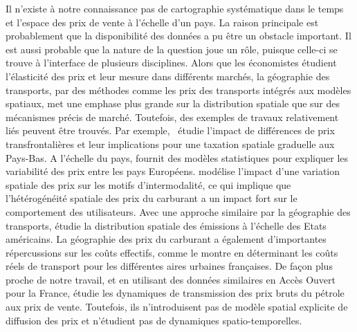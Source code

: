 {Il n'existe à notre connaissance pas de cartographie systématique dans le temps et l'espace des prix de vente à l'échelle d'un pays. La raison principale est probablement que la disponibilité des données a pu être un obstacle important. Il est aussi probable que la nature de la question joue un rôle, puisque celle-ci se trouve à l'interface de plusieurs disciplines. Alors que les économistes étudient l'élasticité des prix et leur mesure dans différents marchés, la géographie des transports, par des méthodes comme les prix des transports intégrés aux modèles spatiaux, met une emphase plus grande sur la distribution spatiale que sur des mécanismes précis de marché. Toutefois, des exemples de travaux relativement liés peuvent être trouvés. Par exemple,~\cite{rietveld2001spatial} étudie l'impact de différences de prix transfrontalières et leur implications pour une taxation spatiale graduelle aux Pays-Bas. A l'échelle du pays, \cite{rietveld2005fuel} fournit des modèles statistiques pour expliquer les variabilité des prix entre les pays Européens. \cite{macharis2010decision} modélise l'impact d'une variation spatiale des prix sur les motifs d'intermodalité, ce qui implique que l'hétérogénéité spatiale des prix du carburant a un impact fort sur le comportement des utilisateurs. Avec une approche similaire par la géographie des transports, \cite{gregg2009temporal} étudie la distribution spatiale des émissions à l'échelle des Etats américains. La géographie des prix du carburant a également d'importantes répercussions sur les coûts effectifs, comme le montre \cite{combes2005transport} en déterminant les coûts réels de transport pour les différentes aires urbaines françaises. De façon plus proche de notre travail, et en utilisant des données similaires en Accès Ouvert pour la France, \cite{gautier2015dynamics} étudie les dynamiques de transmission des prix bruts du pétrole aux prix de vente. Toutefois, ils n'introduisent pas de modèle spatial explicite de diffusion des prix et n'étudient pas de dynamiques spatio-temporelles.
}


